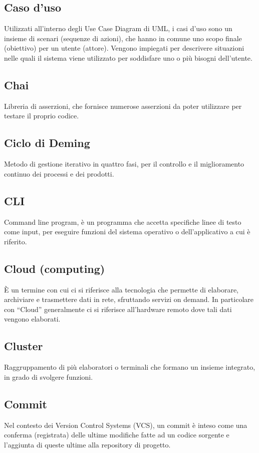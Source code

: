 	\subsection*{Caso d'uso}
	Utilizzati all’interno degli Use Case Diagram di UML, i casi d’uso sono un insieme di scenari (sequenze di azioni), che hanno in comune uno scopo finale (obiettivo) per un utente (attore). Vengono impiegati per descrivere situazioni nelle quali il sistema viene utilizzato per soddisfare uno o più bisogni dell’utente.
	\subsection*{Chai}
	Libreria di asserzioni, che fornisce numerose asserzioni da poter utilizzare per testare il proprio codice.
	\subsection*{Ciclo di Deming}
	Metodo di gestione iterativo in quattro fasi, per il controllo e il miglioramento continuo dei processi e dei prodotti.
	\subsection*{CLI}
	Command line program, è un programma che accetta specifiche linee di testo come input, per eseguire funzioni del sistema operativo o dell’applicativo a cui è riferito.
	\subsection*{Cloud (computing)}
	È un termine con cui ci si riferisce alla tecnologia che permette di elaborare, archiviare e trasmettere dati in rete, sfruttando servizi on demand. In particolare con “Cloud” generalmente ci si riferisce all’hardware remoto dove tali dati vengono elaborati.
	\subsection*{Cluster}
	Raggruppamento di più elaboratori o terminali che formano un insieme integrato, in grado di svolgere funzioni.
	\subsection*{Commit}
	Nel contesto dei Version Control Systems (VCS), un commit è inteso come una conferma (registrata) delle ultime modifiche fatte ad un codice sorgente e l’aggiunta di queste ultime alla repository di progetto.
